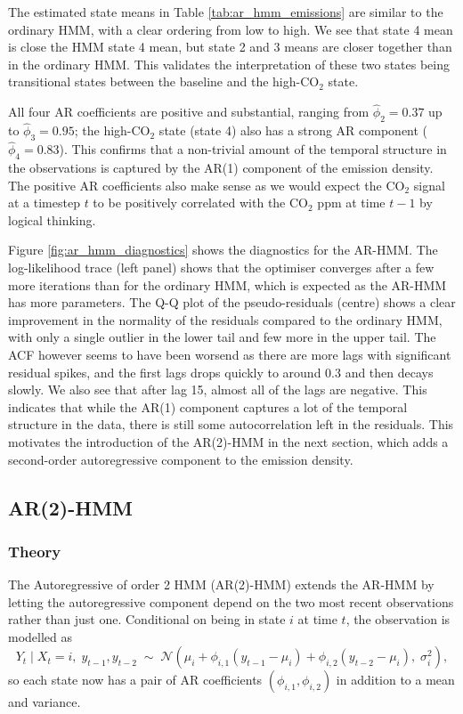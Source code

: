 

The estimated state means in Table \ref{tab:ar_hmm_emissions} are similar to the ordinary HMM, 
with a clear ordering from low to high. We see that state 4 mean is close the HMM state 4 mean, 
but state 2 and 3 means are closer together than in the ordinary HMM. 
This validates the interpretation of these two states being transitional states 
between the baseline and the high-CO$_2$ state. 

All four AR coefficients are
positive and substantial, ranging from $\hat{\phi}_2 = 0.37$ up to
$\hat{\phi}_3 = 0.95$; the high-CO$_2$ state (state 4) also has a strong AR
component ($\hat{\phi}_4 = 0.83$). This confirms that a non-trivial amount of
the temporal structure in the observations is captured by the AR(1) component of the emission density. 
The positive AR coefficients also make sense as we would expect the CO$_2$ 
signal at a timestep $t$ to be positively 
correlated with the CO$_2$ ppm at time $t-1$ by logical thinking. 


Figure \ref{fig:ar_hmm_diagnostics} shows the diagnostics for the AR-HMM. 
The log-likelihood trace (left panel) shows that the optimiser converges after a few
more iterations than for the ordinary HMM, which is expected as the AR-HMM has more parameters. 
The Q-Q plot of the pseudo-residuals (centre) shows a clear improvement in the 
normality of the residuals compared to the ordinary HMM, with only 
a single outlier in the lower tail and few more in the upper tail. 
The ACF however seems to have been worsend as there are more 
lags with significant residual spikes, 
and the first lags drops quickly to around 0.3 and then decays slowly.
We also see that after lag 15, almost all of the lags are negative. 
This indicates that while the AR(1) component captures a lot of the 
temporal structure in the data, there is still some autocorrelation left in the residuals. 
This motivates the introduction of the AR(2)-HMM in the next section, 
which adds a second-order autoregressive component to the emission density.
\subsection{AR(2)-HMM}
\subsubsection{Theory}
The Autoregressive of order 2 HMM (AR(2)-HMM) extends the AR-HMM 
by letting the autoregressive
component depend on the two most recent observations rather than just
one. Conditional on being in state $i$ at time $t$, the observation is
modelled as
\begin{equation}
    Y_t \mid X_t = i,\; y_{t-1}, y_{t-2} \;\sim\; \mathcal{N}\!\left(\mu_i + \phi_{i,1}(y_{t-1} - \mu_i) + \phi_{i,2}(y_{t-2} - \mu_i),\; \sigma_i^2\right),
    \label{eq:ar2_emission}
\end{equation}
so each state now has a pair of AR coefficients
$(\phi_{i,1}, \phi_{i,2})$ in addition to a mean and variance. 

